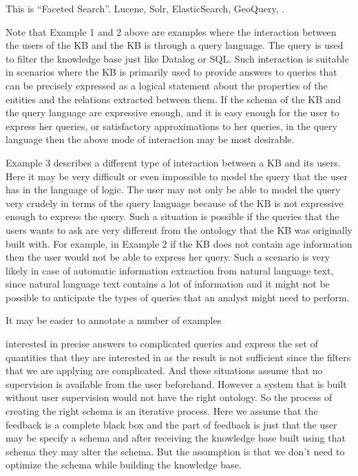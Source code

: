 \documentclass[paper=a4,fontsize=11pt]{scrartcl}
\numberwithin{equation}{section}    %
\numberwithin{figure}{section}      %
\numberwithin{table}{section}       %
\begin{document}
This is ``Faceted Search''. Lucene, Solr, ElasticSearch,
GeoQuery, . 

Note that Example 1 and 2 above are examples where the interaction between the 
users of the KB and the KB is through a query language. The query
is used to filter the knowledge base just like Datalog or SQL. 
Such interaction is suitable in scenarios where the KB is primarily
used to provide answers to queries that can be precisely expressed as a logical statement
about the properties of the entities and the relations extracted between them.
If the schema of the KB and the query language are expressive enough, 
and it is easy enough for the user to express her queries, 
or satisfactory approximations to her queries, in the 
query language then the above mode of interaction may be most desirable.

Example 3 describes a different type of interaction between a KB and its users.
Here it may be very difficult or even impossible to model the query that the user 
has in the language of logic. The user may not only be able to model the query 
very crudely in terms of the query language because of the KB 
is not expressive enough to express the query. Such a situation is possible 
if the queries that the users wants to ask are very different from the 
ontology that the KB was originally built with. For example, in Example 2
if the KB does not contain age information then the user would not be 
able to express her query. Such a scenario is very likely in case of
automatic information extraction from natural language text, since natural 
language text contains a lot of information and it might not be possible to anticipate 
the types of queries that an analyst might need to perform. 

It may be easier to annotate a number of examples 

 interested in precise
answers to complicated queries and express the set of  
quantities that they are interested in as the result 
 is not sufficient since the filters that we are applying are complicated.
 And these situations assume that no supervision is available from the user
 beforehand. However a system that is built without user supervision would not
 have the right ontology. So the process of creating the right schema is an 
 iterative process. Here we assume that the feedback is a complete black box and
 the part of feedback is just that the user may be specify a schema and after 
 receiving the knowledge base built using that schema they may alter the schema.
 But the assumption is that we don't need to optimize the schema while building 
 the knowledge base.
\end{document}
